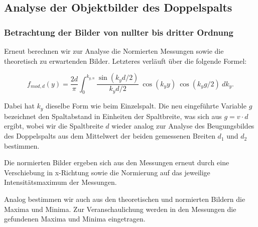 \documentclass{article}
\begin{document}
\clearpage
\newpage
\subsection{Analyse der Objektbilder des Doppelspalts}

\subsubsection{Betrachtung der Bilder von nullter bis dritter Ordnung}

Erneut berechnen wir zur Analyse die Normierten Messungen sowie die theoretisch zu erwartenden Bilder. Letzteres verläuft über die folgende Formel:

\begin{equation}
    f_{mod,d} (y) = \frac{2d}{\pi} \int_0^{k_{y,n}} \frac{\sin{(k_y d / 2)}}{k_y d / 2} \ \cos{(k_y y)} \ \cos{(k_y g / 2)} \ dk_y.
\end{equation}

Dabei hat $k_y$ dieselbe Form wie beim Einzelspalt. Die neu eingeführte Variable $g$ bezeichnet den Spaltabstand in Einheiten der Spaltbreite, was sich aus $g= v \cdot d$ ergibt, wobei wir die Spaltbreite $d$ wieder analog zur Analyse des Beugungsbildes des Doppelspalts aus dem Mittelwert der beiden gemessenen Breiten $d_1$ und $d_2$ bestimmen. 

Die normierten Bilder ergeben sich aus den Messungen erneut durch eine Verschiebung in x-Richtung sowie die Normierung auf das jeweilige Intensitätsmaximum der Messungen.

Analog bestimmen wir auch aus den theoretischen und normierten Bildern die Maxima und Minima. Zur Veranschaulichung werden in den Messungen die gefundenen Maxima und Minima eingetragen.   

\newpage
\end{document}

